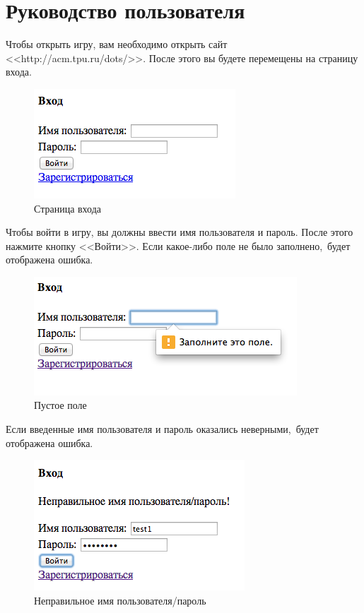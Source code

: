 \documentclass[14pt,a4paper]{report}
\makeatletter
\newif\if@prechapterused
\let\oldchapter\chapter
\renewcommand{\chapter}[1]
{
\if@prechapterused\vspace{-2em}\@prechapterusedfalse\fi
\begingroup
	\let\clearpage\relax
	\let\cleardoublepage\relax
	\oldchapter{#1}
\endgroup
}
\makeatother
\begin{document}
\chapter{Руководство пользователя}
Чтобы открыть игру, вам необходимо открыть сайт <<http://acm.tpu.ru/dots/>>. После этого вы будете перемещены на страницу входа.
\begin{figure}[H]
\centerline{\includegraphics[scale=0.5]{gfx/1_login.png}}
\caption{Страница входа}
\label{fig:login}
\end{figure}
Чтобы войти в игру, вы должны ввести имя пользователя и пароль. После этого нажмите кнопку <<Войти>>. Если какое-либо поле не было заполнено,~будет отображена ошибка.
\begin{figure}[H]
\centerline{\includegraphics[scale=0.5]{gfx/2_login_nodata.png}}
\caption{Пустое поле}
\label{fig:login_nodata}
\end{figure}
Если введенные имя пользователя и пароль оказались неверными,~будет отображена ошибка.
\begin{figure}[H]
\centerline{\includegraphics[scale=0.5]{gfx/3_login_wrong.png}}
\caption{Неправильное имя пользователя/пароль}
\label{fig:login_wrong}
\end{figure}
\end{document}
